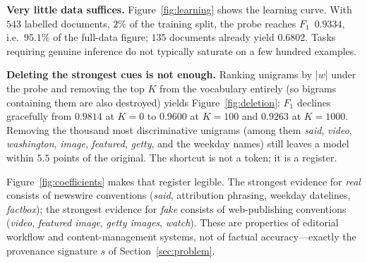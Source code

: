 \documentclass[conference]{IEEEtran}
\newcommand{\Fone}{$F_1$}
\begin{document}
\textbf{Very little data suffices.} Figure~\ref{fig:learning} shows the
learning curve. With $543$ labelled documents, $2\%$ of the training
split, the probe reaches \Fone{}~$0.9334$, i.e.\ $95.1\%$ of the full-data
figure; $135$ documents already yield $0.6802$. Tasks requiring genuine
inference do not typically saturate on a few hundred examples.

\textbf{Deleting the strongest cues is not enough.} Ranking unigrams by
$|w|$ under the probe and removing the top $K$ from the vocabulary entirely
(so bigrams containing them are also destroyed) yields
Figure~\ref{fig:deletion}: \Fone{} declines gracefully from $0.9814$ at $K=0$
to $0.9600$ at $K=100$ and $0.9263$ at $K=1000$. Removing the thousand most
discriminative unigrams (among them \emph{said}, \emph{video},
\emph{washington}, \emph{image}, \emph{featured}, \emph{getty}, and the
weekday names) still leaves a model within $5.5$ points of the original. The
shortcut is not a token; it is a register.

Figure~\ref{fig:coefficients} makes that register legible. The strongest
evidence for \emph{real} consists of newswire conventions (\emph{said},
attribution phrasing, weekday datelines, \emph{factbox}); the strongest
evidence for \emph{fake} consists of web-publishing conventions
(\emph{video}, \emph{featured image}, \emph{getty images}, \emph{watch}).
These are properties of editorial workflow and content-management systems, not
of factual accuracy---exactly the provenance signature $s$ of
Section~\ref{sec:problem}.
\end{document}
